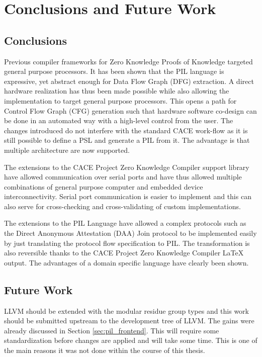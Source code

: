 \chapter{Conclusions and Future Work}

\section{Conclusions}

Previous compiler frameworks for Zero Knowledge Proofs of Knowledge
targeted general purpose processors. It has been shown that the PIL
language is expressive, yet abstract enough for Data Flow Graph (DFG)
extraction. A direct hardware realization has thus been made possible
while also allowing the implementation to target general purpose
processors. This opens a path for Control Flow Graph (CFG) generation
such that hardware software co-design can be done in an automated way
with a high-level control from the user. The changes introduced do not
interfere with the standard CACE work-flow as it is still possible to
define a PSL and generate a PIL from it. The advantage is that
multiple architecture are now supported.

The extensions to the CACE Project Zero Knowledge Compiler support
library have allowed communication over serial ports and have thus
allowed multiple combinations of general purpose computer and embedded
device interconnectivity. Serial port communication is easier to
implement and this can also serve for cross-checking and
cross-validating of custom implementations.

The extensions to the PIL Language have allowed a complex protocols
such as the Direct Anonymous Attestation (DAA) Join protocol to be
implemented easily by just translating the protocol flow specification
to PIL. The transformation is also reversible thanks to the CACE
Project Zero Knowledge Compiler \LaTeX{} output. The advantages of a
domain specific language have clearly been shown.

\section{Future Work}

LLVM should be extended with the modular residue group types and this
work should be submitted upstream to the development tree of LLVM. The
gains were already discussed in Section \ref{sec:pil_frontend}. This
will require some standardization before changes are applied and will
take some time. This is one of the main reasons it was not done within
the course of this thesis.

